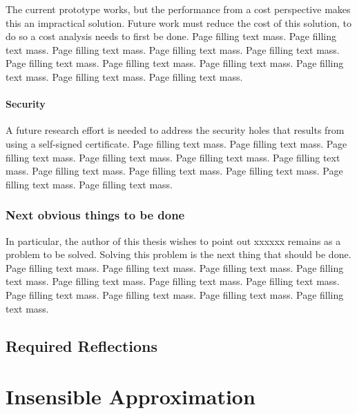 \documentclass[12pt,a4paper,twoside,openright]{book}
\begin{document}
The current prototype works, but the performance from a cost perspective makes
this an impractical solution. Future work must reduce the cost of this
solution, to do so a cost analysis needs to first be done. Page filling text
mass. Page filling text mass. Page filling text mass. Page filling text
mass. Page filling text mass. Page filling text mass. Page filling text
mass. Page filling text mass. Page filling text mass. Page filling text
mass. Page filling text mass.

\subsubsection{Security}

A future research effort is needed to address the security holes that results
from using a self-signed certificate. Page filling text mass. Page filling
text mass. Page filling text mass. Page filling text mass. Page filling text
mass. Page filling text mass. Page filling text mass. Page filling text
mass. Page filling text mass. Page filling text mass. Page filling text mass.


\subsection{Next obvious things to be done}

In particular, the author of this thesis wishes to point out xxxxxx remains as
a problem to be solved. Solving this problem is the next thing that should be
done. Page filling text mass. Page filling text mass. Page filling text
mass. Page filling text mass. Page filling text mass. Page filling text
mass. Page filling text mass. Page filling text mass. Page filling text
mass. Page filling text mass. Page filling text mass.

\section{Required Reflections}
\label{sec:req-reflections}




\appendix
\chapter{Insensible Approximation}

\backmatter
\end{document}
